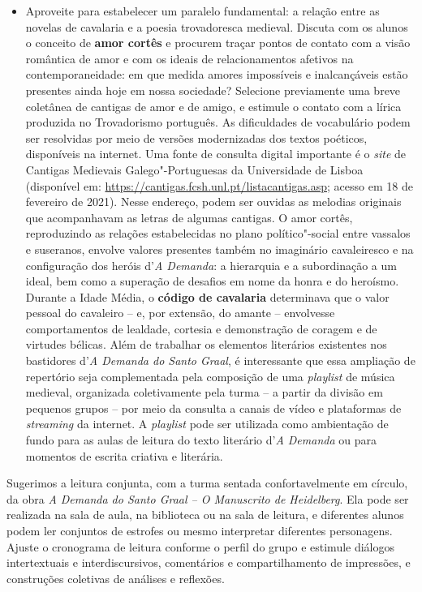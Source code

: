 \documentclass{extarticle}
\begin{document}
\begin{itemize}
\item
  Aproveite para estabelecer um paralelo fundamental: a relação entre as
  novelas de cavalaria e a poesia trovadoresca medieval. Discuta com os
  alunos o conceito de \textbf{amor cortês} e procurem traçar pontos de
  contato com a visão romântica de amor e com os ideais de
  relacionamentos afetivos na contemporaneidade: em que medida amores
  impossíveis e inalcançáveis estão presentes ainda hoje em nossa
  sociedade? Selecione previamente uma breve coletânea de cantigas de
  amor e de amigo, e estimule o contato com a lírica produzida no
  Trovadorismo português. As dificuldades de vocabulário podem ser
  resolvidas por meio de versões modernizadas dos textos poéticos,
  disponíveis na internet. Uma fonte de consulta digital importante é o
  \emph{site} de Cantigas Medievais Galego"-Portuguesas da Universidade
  de Lisboa (disponível em:
  \url{https://cantigas.fcsh.unl.pt/listacantigas.asp}; acesso em 18 de
  fevereiro de 2021). Nesse endereço, podem ser ouvidas as melodias
  originais que acompanhavam as letras de algumas cantigas. O amor
  cortês, reproduzindo as relações estabelecidas no plano
  político"-social entre vassalos e suseranos, envolve valores presentes
  também no imaginário cavaleiresco e na configuração dos heróis
  d'\emph{A Demanda}: a hierarquia e a subordinação a um ideal, bem como
  a superação de desafios em nome da honra e do heroísmo. Durante a
  Idade Média, o \textbf{código de cavalaria} determinava que o valor
  pessoal do cavaleiro -- e, por extensão, do amante -- envolvesse
  comportamentos de lealdade, cortesia e demonstração de coragem e de
  virtudes bélicas. Além de trabalhar os elementos literários existentes
  nos bastidores d'\emph{A Demanda do Santo Graal}, é interessante que
  essa ampliação de repertório seja complementada pela composição de uma
  \emph{playlist} de música medieval, organizada coletivamente pela
  turma -- a partir da divisão em pequenos grupos -- por meio da
  consulta a canais de vídeo e plataformas de \emph{streaming} da
  internet. A \emph{playlist} pode ser utilizada como ambientação de
  fundo para as aulas de leitura do texto literário d'\emph{A Demanda}
  ou para momentos de escrita criativa e literária.
\end{itemize}

Sugerimos a leitura conjunta, com a turma sentada
confortavelmente em círculo, da obra \emph{A Demanda do Santo Graal -- O
Manuscrito de Heidelberg}. Ela pode ser realizada na sala de aula, na
biblioteca ou na sala de leitura, e diferentes alunos podem ler
conjuntos de estrofes ou mesmo interpretar diferentes personagens.
Ajuste o cronograma de leitura conforme o perfil do grupo e estimule
diálogos intertextuais e interdiscursivos, comentários e
compartilhamento de impressões, e construções coletivas de análises e
reflexões.
\end{document}
